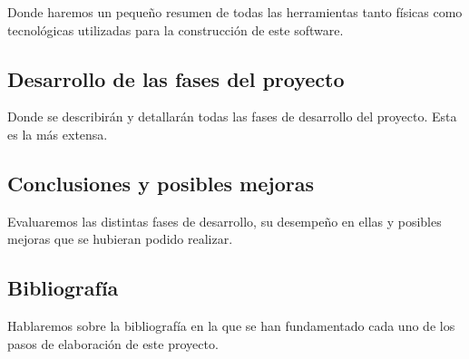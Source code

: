 Donde haremos un pequeño resumen de todas las herramientas tanto físicas como tecnológicas utilizadas para la construcción de este software.

\subsection{Desarrollo de las fases del proyecto}

Donde se describirán y detallarán todas las fases de desarrollo del proyecto. Esta es la más extensa.

\subsection{Conclusiones y posibles mejoras}

Evaluaremos las distintas fases de desarrollo, su desempeño en ellas y posibles mejoras que se hubieran podido realizar.

\subsection{Bibliografía}

Hablaremos sobre la bibliografía en la que se han fundamentado cada uno de los pasos de elaboración de este proyecto.

